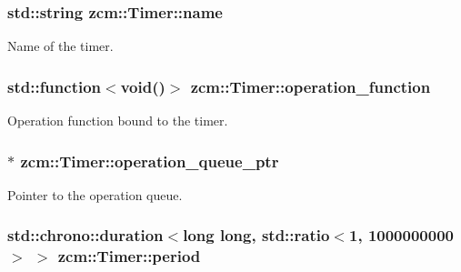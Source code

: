 \subsubsection[{\texorpdfstring{name}{name}}]{\setlength{\rightskip}{0pt plus 5cm}std\+::string zcm\+::\+Timer\+::name\hspace{0.3cm}{\ttfamily [private]}}\hypertarget{classzcm_1_1Timer_abfd2bb014b496ce2eda5a5837e9275f1}{}\label{classzcm_1_1Timer_abfd2bb014b496ce2eda5a5837e9275f1}


Name of the timer. 

\subsubsection[{\texorpdfstring{operation\+\_\+function}{operation_function}}]{\setlength{\rightskip}{0pt plus 5cm}std\+::function$<$void()$>$ zcm\+::\+Timer\+::operation\+\_\+function\hspace{0.3cm}{\ttfamily [private]}}\hypertarget{classzcm_1_1Timer_a07f820c2d67029b83547bbfd77fc3690}{}\label{classzcm_1_1Timer_a07f820c2d67029b83547bbfd77fc3690}


Operation function bound to the timer. 

\subsubsection[{\texorpdfstring{operation\+\_\+queue\+\_\+ptr}{operation_queue_ptr}}]{$\ast$ zcm\+::\+Timer\+::operation\+\_\+queue\+\_\+ptr\hspace{0.3cm}{\ttfamily [private]}}\hypertarget{classzcm_1_1Timer_a9f2ce34fb9230c4251355fde956b7220}{}\label{classzcm_1_1Timer_a9f2ce34fb9230c4251355fde956b7220}


Pointer to the operation queue. 

\subsubsection[{\texorpdfstring{period}{period}}]{\setlength{\rightskip}{0pt plus 5cm}std\+::chrono\+::duration$<$long long, std\+::ratio$<$1, 1000000000$>$ $>$ zcm\+::\+Timer\+::period\hspace{0.3cm}{\ttfamily [private]}}\hypertarget{classzcm_1_1Timer_a36c7498a7ad5706ceca83429e6c1759c}{}\label{classzcm_1_1Timer_a36c7498a7ad5706ceca83429e6c1759c}


